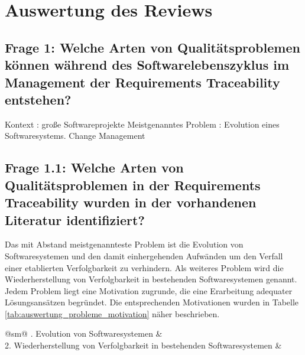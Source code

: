\section{Auswertung des Reviews}

\subsection{Frage 1: Welche Arten von Qualitätsproblemen können während des Softwarelebenszyklus im Management der Requirements Traceability entstehen?}

Kontext : große Softwareprojekte
Meistgenanntes Problem : Evolution eines Softwaresystems. Change Management

\subsection{Frage 1.1: Welche Arten von Qualitätsproblemen in der Requirements Traceability wurden in der vorhandenen Literatur identifiziert?}

Das mit Abstand meistgenannteste Problem ist die Evolution von Softwaresystemen und den damit einhergehenden Aufwänden um den Verfall einer etablierten Verfolgbarkeit zu verhindern. Als weiteres Problem wird die Wiederherstellung von Verfolgbarkeit in bestehenden Softwaresystemen genannt. Jedem Problem liegt eine Motivation zugrunde, die eine Erarbeitung adequater  Lösungsansätzen begründet. Die entsprechenden Motivationen wurden in Tabelle \ref{tab:auswertung_probleme_motivation} näher beschrieben.

\begin{table}[!ht]
\renewcommand{\arraystretch}{1.3}
\caption{Probleme in der Requirements Traceability}
\label{tab:auswertung_probleme_allgemein}
\centering
\begin{tabularx}{\columnwidth}{@{}sm@{}}
. Evolution von Softwaresystemen & \cite{Saputri2016EnsuringApproach,Bavota2014EnhancingInformation,Spanoudakis2004Rule-basedRelations,Javed2014ACode,Tsuchiya2015InteractiveLogs,Omoronyia2011ExploringTraceability,Lago2009AManagement, Mader2009EnablingRelations,Mder2012TowardsMaintenance,Ghabi2015ExploitingCode} \\
2. Wiederherstellung von Verfolgbarkeit in bestehenden Softwaresystemen & \cite{Mder2007CustomizingProcess,Leuser2010TacklingSpecifications,Merten2016DoData} \\
\bottomrule
\end{tabularx} 
\end{table}


